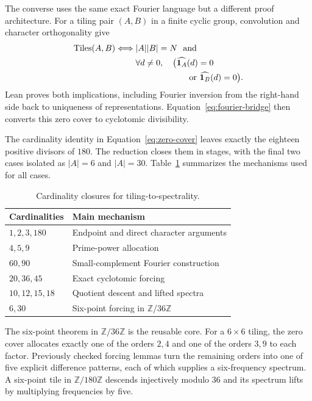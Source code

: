 \documentclass[10pt,twocolumn]{article}
\theoremstyle{definition}
\theoremstyle{remark}
\newcommand{\Z}{\mathbb Z}
\newcommand{\Zmod}[1]{\Z/#1\Z}
\begin{document}
The converse uses the same exact Fourier language but a different proof
architecture.  For a tiling pair $(A,B)$ in a finite cyclic group, convolution
and character orthogonality give
\begin{equation}\label{eq:zero-cover}
\begin{aligned}
 \operatorname{Tiles}(A,B)\Longleftrightarrow{}&
 |A||B|=N\ \text{ and}\\
 &\forall d\ne0,\quad \bigl(\widehat{\mathbf 1_A}(d)=0\\
 &\hspace{6.3em}\text{or }\widehat{\mathbf 1_B}(d)=0\bigr).
\end{aligned}
\end{equation}
Lean proves both implications, including Fourier inversion from the right-hand
side back to uniqueness of representations.  Equation~\eqref{eq:fourier-bridge}
then converts this zero cover to cyclotomic divisibility.

The cardinality identity in Equation~\eqref{eq:zero-cover} leaves exactly the
eighteen positive divisors of $180$.  The reduction closes them in stages,
with the final two cases isolated as $|A|=6$ and $|A|=30$.
Table~\ref{tab:converse-cases} summarizes the mechanisms used for all cases.

\begin{table}[t]
\centering
\caption{Cardinality closures for tiling-to-spectrality.}
\label{tab:converse-cases}
\small
\begin{tabular}{@{}p{}p{}@{}}
\toprule
Cardinalities & Main mechanism \\
\midrule
$1,2,3,180$ & Endpoint and direct character arguments \\
$4,5,9$ & Prime-power allocation \\
$60,90$ & Small-complement Fourier construction \\
$20,36,45$ & Exact cyclotomic forcing \\
$10,12,15,18$ & Quotient descent and lifted spectra \\
$6,30$ & Six-point forcing in $\Zmod{36}$ \\
\bottomrule
\end{tabular}
\end{table}

The six-point theorem in $\Zmod{36}$ is the reusable core.  For a $6\times6$
tiling, the zero cover allocates exactly one of the orders $2,4$ and one of the
orders $3,9$ to each factor.  Previously checked forcing lemmas turn the
remaining orders into one of five explicit difference patterns, each of which
supplies a six-frequency spectrum.  A six-point tile in $\Zmod{180}$ descends
injectively modulo $36$ and its spectrum lifts by multiplying frequencies by
five.
\end{document}
